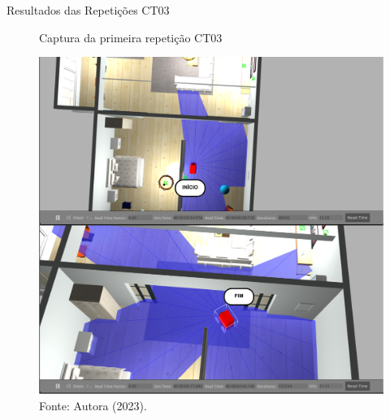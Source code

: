 \begin{table}[H]
\centering
\caption{Resultados das Repetições CT03}
\label{tab:acertosct03}
\caption*{Fonte: Autora (2023).}
\end{table}

\begin{figure}[H]
    \centering
    \caption{Captura da primeira repetição CT03}
    \includegraphics[scale=0.5]{ct03_1.png}
    \caption*{Fonte: Autora (2023).}
    \label{fig:ct03_1}
\end{figure}


